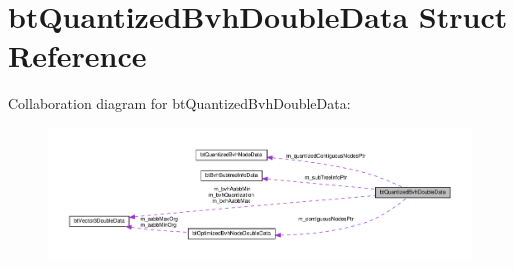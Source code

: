 \hypertarget{structbtQuantizedBvhDoubleData}{}\section{bt\+Quantized\+Bvh\+Double\+Data Struct Reference}
\label{structbtQuantizedBvhDoubleData}


Collaboration diagram for bt\+Quantized\+Bvh\+Double\+Data\+:
\nopagebreak
\begin{figure}[H]
\begin{center}
\leavevmode
\includegraphics[width=350pt]{structbtQuantizedBvhDoubleData__coll__graph}
\end{center}
\end{figure}
